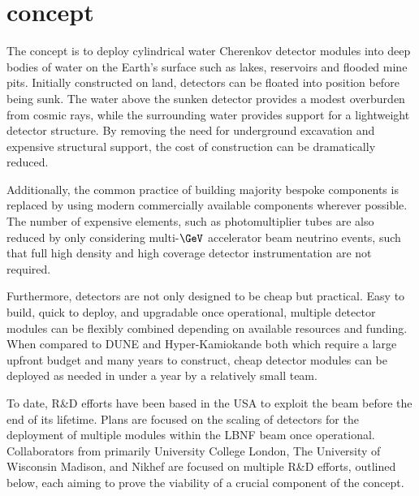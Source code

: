 \section{\chips concept} %
\label{sec:chips_concept} %

The \chips concept is to deploy cylindrical water Cherenkov detector modules into deep bodies of
water on the Earth's surface such as lakes, reservoirs and flooded mine pits. Initially
constructed on land, \chips detectors can be floated into position before being sunk. The water
above the sunken detector provides a modest overburden from cosmic rays, while the surrounding
water provides support for a lightweight detector structure. By removing the need for underground
excavation and expensive structural support, the cost of construction can be dramatically reduced.

Additionally, the common practice of building majority bespoke components is replaced by using
modern commercially available components wherever possible. The number of expensive elements, such
as photomultiplier tubes are also reduced by only considering multi-$\GeV$ accelerator beam
neutrino events, such that full high density and high coverage detector instrumentation are not
required.

Furthermore, \chips detectors are not only designed to be cheap but practical. Easy to build,
quick to deploy, and upgradable once operational, multiple detector modules can be flexibly
combined depending on available resources and funding. When compared to DUNE and Hyper-Kamiokande
both which require a large upfront budget and many years to construct, cheap \chips detector
modules can be deployed as needed in under a year by a relatively small team.

To date, \chips R\&D efforts have been based in the USA to exploit the \numi beam before the end
of its lifetime. Plans are focused on the scaling of \chips detectors for the deployment of
multiple modules within the LBNF beam once operational. Collaborators from primarily University
College London, The University of Wisconsin Madison, and Nikhef are focused on multiple R\&D
efforts, outlined below, each aiming to prove the viability of a crucial component of the \chips
concept.

